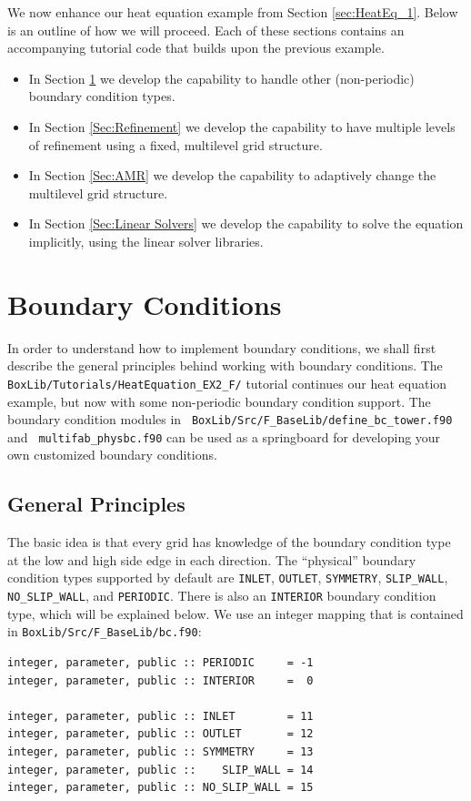 We now enhance our heat equation example from Section \ref{sec:HeatEq_1}.
Below is an outline of how we will proceed.  Each of these sections contains an 
accompanying tutorial code that builds upon the previous example.
\begin{itemize}

\item In Section \ref{Sec:Boundary Conditions} we develop the
  capability to handle other (non-periodic) boundary condition types.

\item In Section \ref{Sec:Refinement} we develop the capability to
  have multiple levels of refinement using a fixed, multilevel grid
  structure.

\item In Section \ref{Sec:AMR} we develop the capability to adaptively
  change the multilevel grid structure.

\item In Section \ref{Sec:Linear Solvers} we develop the capability to
  solve the equation implicitly, using the linear solver libraries.

\end{itemize}

\section{Boundary Conditions}\label{Sec:Boundary Conditions}
In order to understand how to implement boundary conditions, we shall
first describe the general principles behind working with boundary
conditions.  The {\tt BoxLib/Tutorials/HeatEquation\_EX2\_F/} tutorial
continues our heat equation example, but now with some non-periodic
boundary condition support.  The boundary condition modules in {\tt
  BoxLib/Src/F\_BaseLib/define\_bc\_tower.f90} and {\tt
  multifab\_physbc.f90} can be used as a springboard for developing
your own customized boundary conditions.

\subsection{General Principles}
The basic idea is that every grid has knowledge of the
boundary condition type at the low and high side edge in each direction.
The ``physical'' boundary condition types supported by default are {\tt INLET}, {\tt OUTLET},
{\tt SYMMETRY}, {\tt SLIP\_WALL}, {\tt NO\_SLIP\_WALL}, and {\tt PERIODIC}.
There is also an {\tt INTERIOR} boundary condition type, which 
will be explained below.  We use an integer mapping that is 
contained in {\tt BoxLib/Src/F\_BaseLib/bc.f90}:
\begin{lstlisting}[backgroundcolor=\color{light-green}]
integer, parameter, public :: PERIODIC     = -1
integer, parameter, public :: INTERIOR     =  0

integer, parameter, public :: INLET        = 11
integer, parameter, public :: OUTLET       = 12
integer, parameter, public :: SYMMETRY     = 13
integer, parameter, public ::    SLIP_WALL = 14
integer, parameter, public :: NO_SLIP_WALL = 15
\end{lstlisting}

